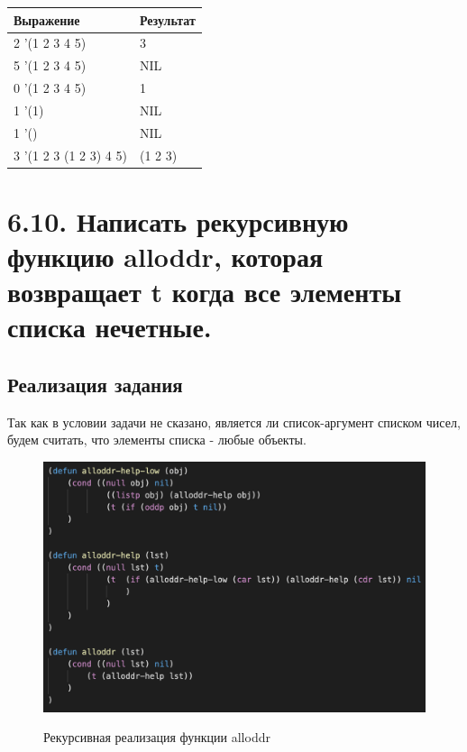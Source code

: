 \documentclass[a4paper,12pt]{article}
\begin{document}
 	 	 	\begin{table} [h!]
 		\begin{center}
 			\begin{tabular}{|l|l|}
 				\hline
 				{\bf  Выражение} & {\bf Результат} \\
 				\hline
 				{2 '(1 2 3 4 5)} & 3\\
 				\hline
 				{5 '(1 2 3 4 5)} & NIL\\
 				\hline
 				{0 '(1 2 3 4 5)} & 1\\
 				\hline
 				{1 '(1)} & NIL\\
 				\hline
 				{1 '()} & NIL\\
 				\hline
 				{3 '(1 2 3 (1 2 3) 4 5)} & (1 2 3)\\
 				\hline
 			\end{tabular}  
 			\label{m2}
 		\end{center}
 	\end{table}
 
 	\newpage
 	
 	\section*{6.10. Написать рекурсивную функцию alloddr, которая возвращает t когда все
элементы списка нечетные.
 	}
 	
 	\subsection*{Реализация задания}
 	
 	Так как в условии задачи не сказано, является ли список-аргумент списком чисел, будем считать, что элементы списка - любые объекты.
 	
 	\begin{figure}[h!]
 		\begin{center}
 			{\includegraphics[scale = 0.8]{6.10.png}}
 			\label{ris:6.10}
 		\end{center}
 	\caption{Рекурсивная реализация функции alloddr}
 	\end{figure}
 	
\end{document}
